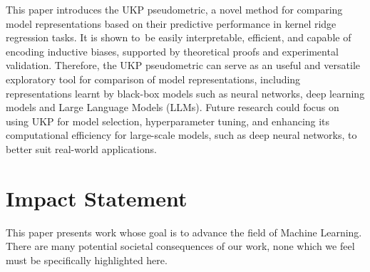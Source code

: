 \documentclass{article}
\theoremstyle{plain}
\newcommand{\metricstname}{UKP }
\begin{document}
This paper introduces the \metricstname pseudometric, a novel method for comparing model representations based on their predictive performance in kernel ridge regression tasks. It is shown to be easily interpretable, efficient, and capable of encoding inductive biases, supported by theoretical proofs and experimental validation. Therefore, the \metricstname pseudometric can serve as an useful and versatile exploratory tool for comparison of model representations, including representations learnt by black-box models such as neural networks, deep learning models and Large Language Models (LLMs). Future research could focus on using \metricstname for model selection, hyperparameter tuning, and enhancing its computational efficiency for large-scale models, such as deep neural networks, to better suit real-world applications.




\section*{Impact Statement}

This paper presents work whose goal is to advance the field of 
Machine Learning. There are many potential societal consequences 
of our work, none which we feel must be specifically highlighted here.

\nocite{*}
% 



\newpage
\appendix
\onecolumn
\end{document}
